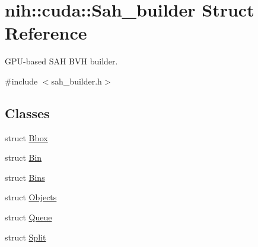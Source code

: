 \hypertarget{structnih_1_1cuda_1_1_sah__builder}{
\section{nih\-:\-:cuda\-:\-:\-Sah\-\_\-builder \-Struct \-Reference}
\label{structnih_1_1cuda_1_1_sah__builder}
}


\-G\-P\-U-\/based \-S\-A\-H \-B\-V\-H builder.  




{\ttfamily \#include $<$sah\-\_\-builder.\-h$>$}

\subsection*{\-Classes}
\begin{DoxyCompactItemize}
\item 
struct \hyperlink{structnih_1_1cuda_1_1_sah__builder_1_1_bbox}{\-Bbox}
\item 
struct \hyperlink{structnih_1_1cuda_1_1_sah__builder_1_1_bin}{\-Bin}
\item 
struct \hyperlink{structnih_1_1cuda_1_1_sah__builder_1_1_bins}{\-Bins}
\item 
struct \hyperlink{structnih_1_1cuda_1_1_sah__builder_1_1_objects}{\-Objects}
\item 
struct \hyperlink{structnih_1_1cuda_1_1_sah__builder_1_1_queue}{\-Queue}
\item 
struct \hyperlink{structnih_1_1cuda_1_1_sah__builder_1_1_split}{\-Split}
\end{DoxyCompactItemize}
